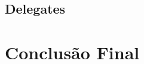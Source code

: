 \documentclass[rel_mlp]{iiufrgs}
\begin{document}
\section{Delegates}

\chapter{Conclusão Final}






%

%



%

\end{document}

